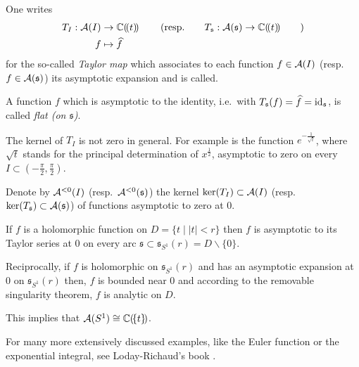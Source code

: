 One writes
\begin{align*}
  T_{I}:\mathcal{A}(I)&\to\mathbb{C}(\!(t)\!)
                \qquad\left(\text{resp.}\qquad
                T_{\mathfrak{s}}:\mathcal{A}(\mathfrak{s})\to\mathbb{C}(\!(t)\!)\qquad\right)
  \\f&\mapsto\widehat f
\end{align*}
for the so-called \emph{Taylor map} which associates to each function
$f\in\mathcal{A}(I)$ (resp.\ $f\in\mathcal{A}(\mathfrak{s})$) its asymptotic expansion and is
called.
\begin{defn}
  A function $f$ which is asymptotic to the identity, i.e.\ with
  $T_{\mathfrak{s}}(f)=\widehat f=\operatorname{id}_{\mathfrak{s}}$, is called \emph{flat (on
    $\mathfrak{s}$)}.
\end{defn}

The kernel of $T_{I}$ is not zero in general.
For example is the function $e^{-\frac{1}{\sqrt{t}}}$, where $\sqrt{t}$ stands
for the principal determination of $x^{\frac{1}{2}}$, asymptotic to zero on every
$I\subset\left(-\frac{\pi}{2},\frac{\pi}{2}\right)$.
\begin{defn}
  Denote by $\mathcal{A}^{<0}(I)$ (resp.\ $\mathcal{A}^{<0}(\mathfrak{s})$) the kernel
  $\ker(T_{I})\subset\mathcal{A}(I)$ (resp.\
  $\ker(T_{\mathfrak{s}})\subset\mathcal{A}(\mathfrak{s})$) of functions asymptotic to
  zero at $0$.
\end{defn}

\begin{exmp}
  If $f$ is a holomorphic function on $D=\{t\mid |t|<r\}$ then $f$ is asymptotic
  to its Taylor series at $0$ on every arc
  $\mathfrak{s}\subset\mathfrak{s}_{S^1}(r)=D\backslash\{0\}$.

  Reciprocally, if $f$ is holomorphic on $\mathfrak{s}_{S^1}(r)$ and has an
  asymptotic expansion at $0$ on $\mathfrak{s}_{S^1}(r)$ then, $f$ is bounded
  near $0$ and according to the removable singularity theorem, $f$ is analytic
  on $D$.
  \begin{s-rem}
    This implies that $\mathcal{A}(S^1)\cong\mathbb{C}(\!\{t\}\!)$.
  \end{s-rem}
\end{exmp}
For many more extensively discussed examples, like the Euler function or the
exponential integral, see Loday-Richaud's book \cite[Sec.2.2]{Loday2014}.

